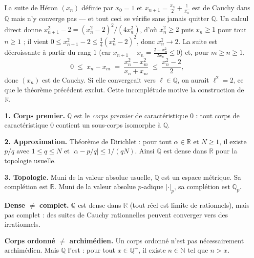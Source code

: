 La suite de Héron $(x_n)$ définie par $x_0 = 1$ et $x_{n+1} = \tfrac{x_n}{2} + \tfrac{1}{x_n}$
est de Cauchy dans $\mathbb{Q}$ mais n'y converge pas — et tout ceci se vérifie
sans jamais quitter $\mathbb{Q}$. Un calcul direct donne
$x_{n+1}^2 - 2 = (x_n^2-2)^2/(4x_n^2)$, d'où $x_n^2 \geq 2$ puis $x_n \geq 1$
pour tout $n \geq 1$ ; il vient $0 \leq x_{n+1}^2 - 2 \leq \tfrac{1}{4}(x_n^2-2)^2$,
donc $x_n^2 \to 2$. La suite est décroissante à partir du rang $1$
(car $x_{n+1} - x_n = \tfrac{2-x_n^2}{2x_n} \leq 0$) et, pour $m \geq n \geq 1$,
\[
  0 \;\leq\; x_n - x_m \;=\; \frac{x_n^2 - x_m^2}{x_n + x_m} \;\leq\; \frac{x_n^2 - 2}{2},
\]
donc $(x_n)$ est de Cauchy. Si elle convergeait vers $\ell \in \mathbb{Q}$, on aurait
$\ell^2 = 2$, ce que le théorème précédent exclut. Cette incomplétude motive la
construction de $\mathbb{R}$.

\decsep{}



\begin{mdframed}[style=exbar]
  \textbf{1. Corps premier.}\enspace%
  $\mathbb{Q}$ est le \emph{corps premier} de caractéristique $0$ : tout corps
  de caractéristique $0$ contient un sous-corps isomorphe à $\mathbb{Q}$.

  \smallskip\noindent
  \textbf{2. Approximation.}\enspace%
  Théorème de Dirichlet : pour tout $\alpha \in \mathbb{R}$ et $N \geq 1$,
  il existe $p/q$ avec $1 \leq q \leq N$ et $|\alpha - p/q| \leq 1/(qN)$.
  Ainsi $\mathbb{Q}$ est dense dans $\mathbb{R}$ pour la topologie usuelle.

  \smallskip\noindent
  \textbf{3. Topologie.}\enspace%
  Muni de la valeur absolue usuelle, $\mathbb{Q}$ est un espace métrique.
  Sa complétion est $\mathbb{R}$. Muni de la valeur absolue $p$-adique
  $|\cdot|_p$, sa complétion est $\mathbb{Q}_p$.
\end{mdframed}

\vspace{6pt}

\begin{mdframed}[style=cexbar]
  \textbf{Dense $\neq$ complet.}\enspace%
  $\mathbb{Q}$ est dense dans $\mathbb{R}$ (tout réel est limite de rationnels),
  mais pas complet : des suites de Cauchy rationnelles peuvent converger vers
  des irrationnels.

  \smallskip\noindent
  \textbf{Corps ordonné $\neq$ archimédien.}\enspace%
  Un corps ordonné n'est pas nécessairement archimédien. Mais $\mathbb{Q}$ l'est :
  pour tout $x \in \mathbb{Q}^+$, il existe $n \in \mathbb{N}$ tel que $n > x$.
\end{mdframed}

